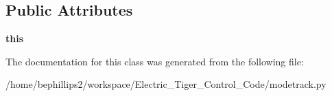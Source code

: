 \subsection*{Public Attributes}
\begin{DoxyCompactItemize}
\item 
\hypertarget{classmodetrack_1_1_mode_track_ac6b9113e1571b427ea59b3347314cee5}{{\bfseries this}}\label{classmodetrack_1_1_mode_track_ac6b9113e1571b427ea59b3347314cee5}

\end{DoxyCompactItemize}


The documentation for this class was generated from the following file\-:\begin{DoxyCompactItemize}
\item 
/home/bephillips2/workspace/\-Electric\-\_\-\-Tiger\-\_\-\-Control\-\_\-\-Code/modetrack.\-py\end{DoxyCompactItemize}
